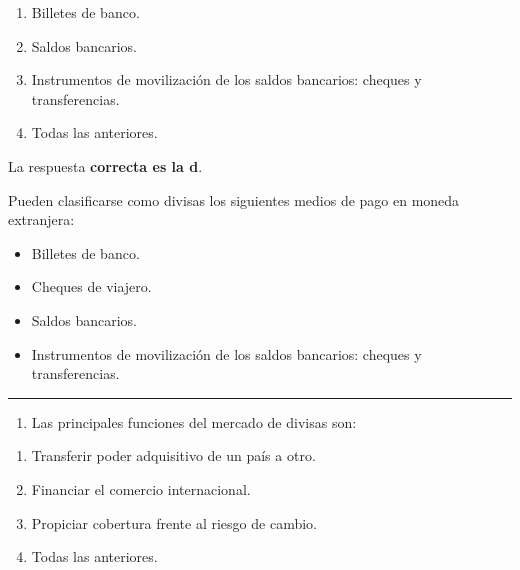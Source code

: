 \documentclass[
  letterpaper,
  DIV=11,
  numbers=noendperiod]{scrreprt}
\providecommand{\tightlist}{%
  \setlength{\itemsep}{0pt}\setlength{\parskip}{0pt}}\usepackage{longtable,booktabs,array}
\begin{document}
\begin{enumerate}
\def\labelenumi{\alph{enumi})}
\item
  Billetes de banco.
\item
  Saldos bancarios.
\item
  Instrumentos de movilización de los saldos bancarios: cheques y
  transferencias.
\item
  Todas las anteriores.
\end{enumerate}

\begin{tcolorbox}[enhanced jigsaw, left=2mm, opacityback=0, colback=white, breakable, arc=.35mm, bottomrule=.15mm, rightrule=.15mm, toprule=.15mm, leftrule=.75mm, colframe=quarto-callout-tip-color-frame]
\begin{minipage}[t]{5.5mm}
\textcolor{quarto-callout-tip-color}{\faLightbulb}
\end{minipage}%
\begin{minipage}[t]{\textwidth - 5.5mm}

La respuesta \textbf{correcta es la d}.

Pueden clasificarse como divisas los siguientes medios de pago en moneda
extranjera:

\begin{itemize}
\item
  Billetes de banco.
\item
  Cheques de viajero.
\item
  Saldos bancarios.
\item
  Instrumentos de movilización de los saldos bancarios: cheques y
  transferencias.
\end{itemize}

\end{minipage}%
\end{tcolorbox}

\begin{center}\rule{0.5\linewidth}{0.5pt}\end{center}

\begin{enumerate}
\def\labelenumi{\arabic{enumi}.}
\setcounter{enumi}{3}
\tightlist
\item
  Las principales funciones del mercado de divisas son:
\end{enumerate}

\begin{enumerate}
\def\labelenumi{\alph{enumi})}
\item
  Transferir poder adquisitivo de un país a otro.
\item
  Financiar el comercio internacional.
\item
  Propiciar cobertura frente al riesgo de cambio.
\item
  Todas las anteriores.
\end{enumerate}
\end{document}

